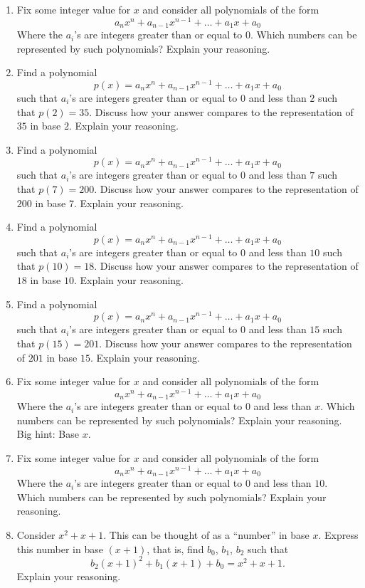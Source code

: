 \begin{problems}
\begin{enumerate}
\item Fix some integer value for $x$ and consider all polynomials of
  the form
\[
a_nx^n + a_{n-1}x^{n-1} + \dots + a_1 x+ a_0
\]
Where the $a_i$'s are integers greater than or equal to $0$. Which
numbers can be represented by such polynomials? Explain your
reasoning.
\item Find a polynomial 
\[
p(x) = a_nx^n + a_{n-1}x^{n-1} + \dots + a_1 x+ a_0
\]
such that $a_i$'s are integers greater than or equal to $0$ and less
than $2$ such that $p(2) = 35$. Discuss how your answer compares to
the representation of $35$ in base $2$. Explain your reasoning.
\item Find a polynomial 
\[
p(x) = a_nx^n + a_{n-1}x^{n-1} + \dots + a_1 x+ a_0
\]
such that $a_i$'s are integers greater than or equal to $0$ and less
than $7$ such that $p(7) = 200$. Discuss how your answer compares to
the representation of $200$ in base $7$. Explain your reasoning.
\item Find a polynomial 
\[
p(x) = a_nx^n + a_{n-1}x^{n-1} + \dots + a_1 x+ a_0
\]
such that $a_i$'s are integers greater than or equal to $0$ and less
than $10$ such that $p(10) = 18$. Discuss how your answer compares to
the representation of $18$ in base $10$. Explain your reasoning.
\item Find a polynomial 
\[
p(x) = a_nx^n + a_{n-1}x^{n-1} + \dots + a_1 x+ a_0
\]
such that $a_i$'s are integers greater than or equal to $0$ and less
than $15$ such that $p(15) = 201$. Discuss how your answer compares to
the representation of $201$ in base $15$. Explain your reasoning.
\item Fix some integer value for $x$ and consider all polynomials of the form
\[
a_nx^n + a_{n-1}x^{n-1} + \dots + a_1 x+ a_0
\]
Where the $a_i$'s are integers greater than or equal to $0$ and less
than $x$. Which numbers can be represented by such polynomials?
Explain your reasoning. Big hint: Base $x$.
\item Fix some integer value for $x$ and consider all polynomials of
  the form
\[
a_nx^n + a_{n-1}x^{n-1} + \dots + a_1 x+ a_0
\]
Where the $a_i$'s are integers greater than or equal to $0$ and less
than $10$. Which numbers can be represented by such polynomials?
Explain your reasoning.

\item Consider $x^2 + x + 1$. This can be thought of as a ``number'' in
  base $x$. Express this number in base $(x+1)$, that is, find $b_0$, $b_1$, $b_2$ such that 
\[
b_2(x+1)^2 +b_1(x+1) + b_0 = x^2 + x + 1.
\]
Explain your reasoning.


\end{enumerate}
\end{problems}

